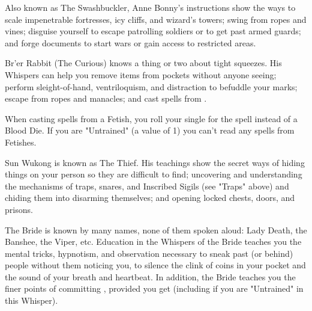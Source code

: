 \newpage



    Also known as The Swashbuckler, Anne Bonny's instructions show the ways to scale impenetrable fortresses, icy cliffs, and wizard's towers; swing from ropes and vines; disguise yourself to escape patrolling soldiers or to get past armed guards; and forge documents to start wars or gain access to restricted areas. 


    Br'er Rabbit (The Curious) knows a thing or two about tight squeezes.  His Whispers can help you remove items from pockets without anyone seeing; perform sleight-of-hand, ventriloquism, and distraction to befuddle your marks; escape from ropes and manacles; and cast spells from . 

    When casting spells from a Fetish, you roll your single \KNAVE for the spell instead of a Blood Die. If you are "Untrained" (a value of 1) you can't read any spells from Fetishes.


    Sun Wukong is known as The Thief.  His teachings show the secret ways of hiding things on your person so they are difficult to find; uncovering and understanding the mechanisms of traps, snares, and Inscribed Sigils (see "Traps" above) and chiding them into disarming themselves; and opening locked chests, doors, and prisons. 



    The Bride is known by many names, none of them spoken aloud:  Lady Death, the Banshee, the Viper, etc.  Education in the Whispers of the Bride teaches you the mental tricks, hypnotism, and observation necessary to sneak past (or behind) people without them noticing you, to silence the clink of coins in your pocket and the sound of your breath and heartbeat. In addition, the Bride teaches you the finer points of committing , provided you get  (including if you are "Untrained" in this Whisper).







